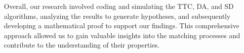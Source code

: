 \documentclass[a4paper,11pt,table]{article}
\theoremstyle{definition}
\theoremstyle{remark}
\begin{document}
  Overall, our research involved coding and simulating the TTC, DA, and SD algorithms, analyzing the results to generate hypotheses, and subsequently developing a mathematical proof to support our findings. This comprehensive approach allowed us to gain valuable insights into the matching processes and contribute to the understanding of their properties.





\end{document}
